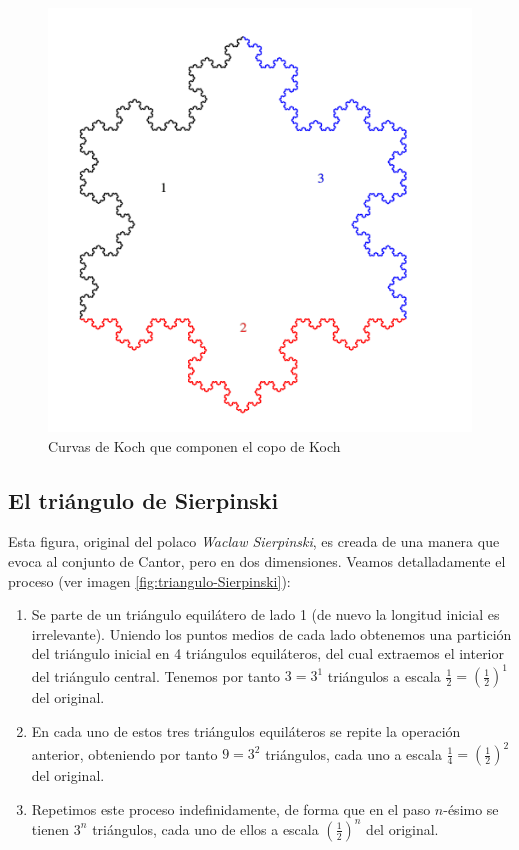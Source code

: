 \begin{figure} [h]
\centering
\includegraphics[scale = 0.2]{img/copo-Koch-colores.png}
\caption{Curvas de Koch que componen el copo de Koch}
\label{fig:copo-Koch-colores}
\end{figure}

\subsection{El triángulo de Sierpinski}
\label{subsection:triangulo-Sierpinski} 

Esta figura, original del polaco \textit{Waclaw Sierpinski}, es creada de una manera que evoca al conjunto de Cantor, pero en dos dimensiones. Veamos detalladamente el proceso (ver imagen \ref{fig:triangulo-Sierpinski}):

\begin{enumerate}
\item Se parte de un triángulo equilátero de lado 1 (de nuevo la longitud inicial es irrelevante). Uniendo los puntos medios de cada lado obtenemos una partición del triángulo inicial en 4 triángulos equiláteros, del cual extraemos el interior del triángulo central. Tenemos por tanto $3=3^1$ triángulos a escala $\frac 1 2 = \left(\frac 1 2\right)^1$ del original.

\item En cada uno de estos tres triángulos equiláteros se repite la operación anterior, obteniendo por tanto $9=3^2$ triángulos, cada uno a escala $\frac 1 4 = \left(\frac 1 2\right)^2$ del original.

\item Repetimos este proceso indefinidamente, de forma que en el paso $n$-ésimo se tienen $3^n$ triángulos, cada uno de ellos a escala $\left(\frac 1 2\right)^n$ del original.
\end{enumerate}

